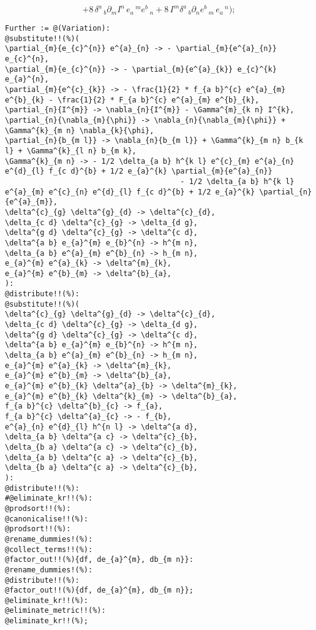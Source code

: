 \documentclass[11pt]{article}
\begin{document}
\begin{dmath*}[compact, spread=2pt]
 + 8\, {\delta}^{a}\,_{b} {\partial}_{m}{{I}^{n}}\,  {e}_{a}\,^{m} {e}^{b}\,_{n} + 8\, {I}^{m} {\delta}^{a}\,_{b} {\partial}_{n}{{e}^{b}\,_{m}}\,  {e}_{a}\,^{n});
\end{dmath*}
{\color[named]{Blue}\begin{verbatim}
Further := @(Variation):
@substitute!!(%)(
\partial_{m}{e_{c}^{n}} e^{a}_{n} -> - \partial_{m}{e^{a}_{n}} e_{c}^{n},
\partial_{m}{e_{c}^{n}} -> - \partial_{m}{e^{a}_{k}} e_{c}^{k} e_{a}^{n},
\partial_{m}{e^{c}_{k}} -> - \frac{1}{2} * f_{a b}^{c} e^{a}_{m} e^{b}_{k} - \frac{1}{2} * F_{a b}^{c} e^{a}_{m} e^{b}_{k},
\partial_{n}{I^{m}} -> \nabla_{n}{I^{m}} - \Gamma^{m}_{k n} I^{k},
\partial_{n}{\nabla_{m}{\phi}} -> \nabla_{n}{\nabla_{m}{\phi}} + \Gamma^{k}_{m n} \nabla_{k}{\phi},
\partial_{n}{b_{m l}} -> \nabla_{n}{b_{m l}} + \Gamma^{k}_{m n} b_{k l} + \Gamma^{k}_{l n} b_{m k},
\Gamma^{k}_{m n} -> - 1/2 \delta_{a b} h^{k l} e^{c}_{m} e^{a}_{n} e^{d}_{l} f_{c d}^{b} + 1/2 e_{a}^{k} \partial_{m}{e^{a}_{n}} 
                                        - 1/2 \delta_{a b} h^{k l} e^{a}_{m} e^{c}_{n} e^{d}_{l} f_{c d}^{b} + 1/2 e_{a}^{k} \partial_{n}{e^{a}_{m}},
\delta^{c}_{g} \delta^{g}_{d} -> \delta^{c}_{d},
\delta_{c d} \delta^{c}_{g} -> \delta_{d g},
\delta^{g d} \delta^{c}_{g} -> \delta^{c d},
\delta^{a b} e_{a}^{m} e_{b}^{n} -> h^{m n},
\delta_{a b} e^{a}_{m} e^{b}_{n} -> h_{m n},
e_{a}^{m} e^{a}_{k} -> \delta^{m}_{k},
e_{a}^{m} e^{b}_{m} -> \delta^{b}_{a},
):
@distribute!!(%):
@substitute!!(%)(
\delta^{c}_{g} \delta^{g}_{d} -> \delta^{c}_{d},
\delta_{c d} \delta^{c}_{g} -> \delta_{d g},
\delta^{g d} \delta^{c}_{g} -> \delta^{c d},
\delta^{a b} e_{a}^{m} e_{b}^{n} -> h^{m n},
\delta_{a b} e^{a}_{m} e^{b}_{n} -> h_{m n},
e_{a}^{m} e^{a}_{k} -> \delta^{m}_{k},
e_{a}^{m} e^{b}_{m} -> \delta^{b}_{a},
e_{a}^{m} e^{b}_{k} \delta^{a}_{b} -> \delta^{m}_{k},
e_{a}^{m} e^{b}_{k} \delta^{k}_{m} -> \delta^{b}_{a},
f_{a b}^{c} \delta^{b}_{c} -> f_{a},
f_{a b}^{c} \delta^{a}_{c} -> - f_{b},
e^{a}_{n} e^{d}_{l} h^{n l} -> \delta^{a d},
\delta_{a b} \delta^{a c} -> \delta^{c}_{b},
\delta_{b a} \delta^{a c} -> \delta^{c}_{b},
\delta_{a b} \delta^{c a} -> \delta^{c}_{b},
\delta_{b a} \delta^{c a} -> \delta^{c}_{b},
):
@distribute!!(%):
#@eliminate_kr!!(%):
@prodsort!!(%):
@canonicalise!!(%):
@prodsort!!(%):
@rename_dummies!(%):
@collect_terms!!(%):
@factor_out!!(%){df, de_{a}^{m}, db_{m n}}:
@rename_dummies!(%):
@distribute!!(%):
@factor_out!!(%){df, de_{a}^{m}, db_{m n}};
@eliminate_kr!!(%):
@eliminate_metric!!(%):
@eliminate_kr!!(%);
\end{verbatim}}
\end{document}
